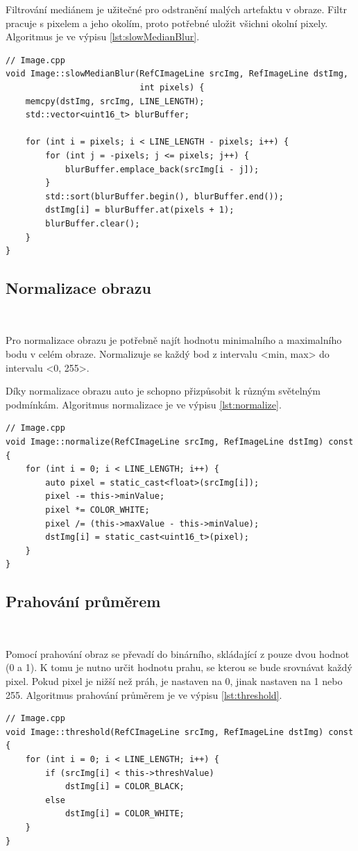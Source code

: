 Filtrování mediánem je užitečné pro odstranění malých artefaktu v obraze.
Filtr pracuje s pixelem a jeho okolím, proto potřebné uložit všichni okolní
pixely. Algoritmus je ve výpisu \ref{lst:slowMedianBlur}\cite{draha}\cite{robot}.

\begin{lstlisting}[caption=Filtrování mediánem, label=lst:slowMedianBlur]
// Image.cpp
void Image::slowMedianBlur(RefCImageLine srcImg, RefImageLine dstImg,
                           int pixels) {
    memcpy(dstImg, srcImg, LINE_LENGTH);
    std::vector<uint16_t> blurBuffer;

    for (int i = pixels; i < LINE_LENGTH - pixels; i++) {
        for (int j = -pixels; j <= pixels; j++) {
            blurBuffer.emplace_back(srcImg[i - j]);
        }
        std::sort(blurBuffer.begin(), blurBuffer.end());
        dstImg[i] = blurBuffer.at(pixels + 1);
        blurBuffer.clear();
    }
}
\end{lstlisting}


\subsection{Normalizace obrazu}\

Pro normalizace obrazu je potřebně najít hodnotu minimalního a maximalního bodu v celém
obraze. Normalizuje se každý bod z intervalu <min, max> do intervalu
<0, 255>.

Díky normalizace obrazu auto je schopno přizpůsobit k různým světelným podmínkám.
Algoritmus normalizace je ve výpisu \ref{lst:normalize}\cite{robot}.
\begin{lstlisting}[caption=Normalizace obrazu, label=lst:normalize]
// Image.cpp
void Image::normalize(RefCImageLine srcImg, RefImageLine dstImg) const {
    for (int i = 0; i < LINE_LENGTH; i++) {
        auto pixel = static_cast<float>(srcImg[i]);
        pixel -= this->minValue;
        pixel *= COLOR_WHITE;
        pixel /= (this->maxValue - this->minValue);
        dstImg[i] = static_cast<uint16_t>(pixel);
    }
}
\end{lstlisting}

\subsection{Prahování průměrem}\

Pomocí prahování obraz se převadí do binárního, skládající z pouze dvou hodnot (0 a 1).
K tomu je nutno určit hodnotu prahu, se kterou se bude srovnávat každý pixel.
Pokud pixel je nižší než práh, je nastaven na 0, jinak nastaven na 1 nebo 255.
Algoritmus prahování průměrem je ve výpisu \ref{lst:threshold}\cite{robot}.
\begin{lstlisting}[caption=Prahování průměrem, label=lst:threshold]
// Image.cpp
void Image::threshold(RefCImageLine srcImg, RefImageLine dstImg) const {
    for (int i = 0; i < LINE_LENGTH; i++) {
        if (srcImg[i] < this->threshValue)
            dstImg[i] = COLOR_BLACK;
        else
            dstImg[i] = COLOR_WHITE;
    }
}
\end{lstlisting}


